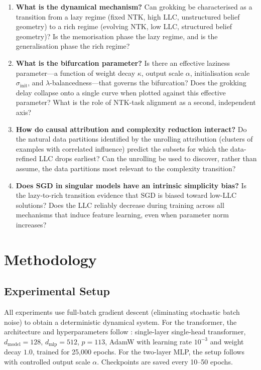 \documentclass[11pt,a4paper]{article}
\begin{document}
\begin{enumerate}[label=\textbf{RQ\arabic*.}, leftmargin=2.5em]
    \item \textbf{What is the dynamical mechanism?} Can grokking be characterised as a transition from a lazy regime (fixed NTK, high LLC, unstructured belief geometry) to a rich regime (evolving NTK, low LLC, structured belief geometry)? Is the memorisation phase the lazy regime, and is the generalisation phase the rich regime?

    \item \textbf{What is the bifurcation parameter?} Is there an effective laziness parameter---a function of weight decay $\kappa$, output scale $\alpha$, initialisation scale $\sigma_{\mathrm{init}}$, and $\lambda$-balancedness---that governs the bifurcation? Does the grokking delay collapse onto a single curve when plotted against this effective parameter? What is the role of NTK-task alignment as a second, independent axis?

    \item \textbf{How do causal attribution and complexity reduction interact?} Do the natural data partitions identified by the unrolling attribution (clusters of examples with correlated influence) predict the subsets for which the data-refined LLC drops earliest? Can the unrolling be used to discover, rather than assume, the data partitions most relevant to the complexity transition?

    \item \textbf{Does SGD in singular models have an intrinsic simplicity bias?} Is the lazy-to-rich transition evidence that SGD is biased toward low-LLC solutions? Does the LLC reliably decrease during training across all mechanisms that induce feature learning, even when parameter norm increases?
\end{enumerate}

\section{Methodology}

\subsection{Experimental Setup}

All experiments use full-batch gradient descent (eliminating stochastic batch noise) to obtain a deterministic dynamical system. For the transformer, the architecture and hyperparameters follow \citet{poncini2025compmech}: single-layer single-head transformer, $d_{\mathrm{model}} = 128$, $d_{\mathrm{mlp}} = 512$, $p = 113$, AdamW with learning rate $10^{-3}$ and weight decay $1.0$, trained for 25,000 epochs. For the two-layer MLP, the setup follows \citet{kumar2024grokking} with controlled output scale $\alpha$. Checkpoints are saved every 10--50 epochs.
\end{document}
